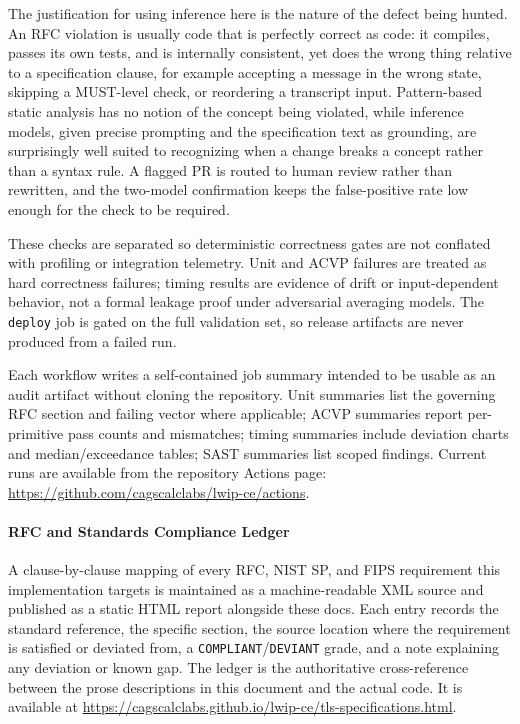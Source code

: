 \documentclass[titlepage]{report}
\begin{document}
		The justification for using inference here is the nature of the defect being hunted. An RFC violation is usually code that is perfectly correct as code: it compiles, passes its own tests, and is internally consistent, yet does the wrong thing relative to a specification clause, for example accepting a message in the wrong state, skipping a MUST-level check, or reordering a transcript input. Pattern-based static analysis has no notion of the concept being violated, while inference models, given precise prompting and the specification text as grounding, are surprisingly well suited to recognizing when a change breaks a concept rather than a syntax rule. A flagged PR is routed to human review rather than rewritten, and the two-model confirmation keeps the false-positive rate low enough for the check to be required.

		These checks are separated so deterministic correctness gates are not conflated with profiling or integration telemetry. Unit and ACVP failures are treated as hard correctness failures; timing results are evidence of drift or input-dependent behavior, not a formal leakage proof under adversarial averaging models. The \texttt{deploy} job is gated on the full validation set, so release artifacts are never produced from a failed run.

		Each workflow writes a self-contained job summary intended to be usable as an audit artifact without cloning the repository. Unit summaries list the governing RFC section and failing vector where applicable; ACVP summaries report per-primitive pass counts and mismatches; timing summaries include deviation charts and median/exceedance tables; SAST summaries list scoped findings. Current runs are available from the repository Actions page: \url{https://github.com/cagscalclabs/lwip-ce/actions}.

		\paragraph{RFC and Standards Compliance Ledger}
		A clause-by-clause mapping of every RFC, NIST SP, and FIPS requirement this implementation targets is maintained as a machine-readable XML source and published as a static HTML report alongside these docs. Each entry records the standard reference, the specific section, the source location where the requirement is satisfied or deviated from, a \texttt{COMPLIANT}/\texttt{DEVIANT} grade, and a note explaining any deviation or known gap. The ledger is the authoritative cross-reference between the prose descriptions in this document and the actual code. It is available at \url{https://cagscalclabs.github.io/lwip-ce/tls-specifications.html}.
\end{document}
